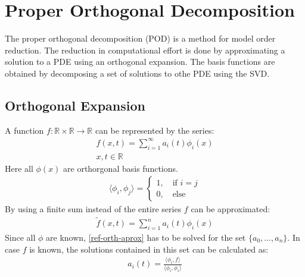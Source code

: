 \section{Proper Orthogonal Decomposition}
The proper orthogonal decomposition (POD) is a method for model order reduction.
The reduction in computational effort is done by approximating a solution to a PDE using an orthogonal expansion.
The basis functions are obtained by decomposing a set of solutions to othe PDE using the SVD.
\subsection{Orthogonal Expansion}
A function \(f: \mathbb{R} \times \mathbb{R} \rightarrow \mathbb{R}\) can be represented by the series:
\begin{gather}
f(x, t) = \sum_{i = 1}^{\infty}a_i(t)\phi_i(x) \\
x, t \in \mathbb{R} \label{ref-orth-exp}
\end{gather}
Here all \(\phi(x)\) are orthorgonal basis functions.
\begin{gather}
\langle\phi_i, \phi_j\rangle =\begin{cases}
1, \quad \text{if } i = j \\
0, \quad \text{else}
\end{cases} \label{phi-orth}
\end{gather}
By using a finite sum instead of the entire  series \(f\) can be approximated:
\begin{gather}
\tilde{f}(x, t) = \sum_{i = 1}^{n}a_{i}(t)\phi_{i}(x) \label{ref-orth-aprox}
\end{gather}
Since all \(\phi\) are known, \ref{ref-orth-aprox} has to be solved for the set \(\{a_0, ..., a_n\}\).
In case \(f\) is known, the solutions contained in this set can be calculated as:
\begin{gather}
a_i(t) = \frac{\langle \phi_i, f \rangle}{\langle \phi_i, \phi_i \rangle} \label{sol-ai}
\end{gather}
\cite{Gustafsson2011e}
